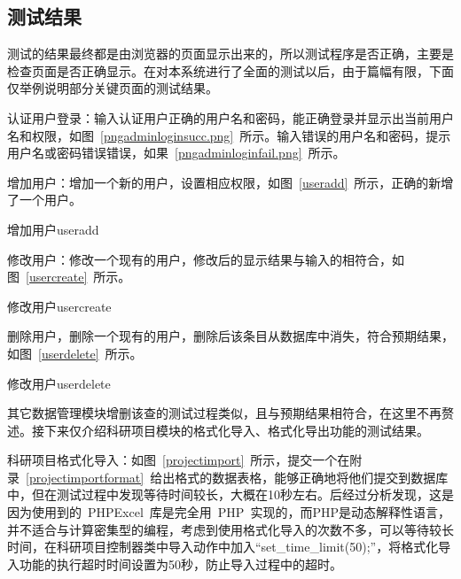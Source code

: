 \subsection{测试结果}

测试的结果最终都是由浏览器的页面显示出来的，所以测试程序是否正确，主要是检查页面是否正确显示。在对本系统进行了全面的测试以后，由于篇幅有限，下面仅举例说明部分关键页面的测试结果。

认证用户登录：输入认证用户正确的用户名和密码，能正确登录并显示出当前用户名和权限，如图~\ref{pngadminloginsucc.png}~所示。输入错误的用户名和密码，提示用户名或密码错误错误，如果~\ref{pngadminloginfail.png}~所示。

增加用户：增加一个新的用户，设置相应权限，如图~\ref{useradd}~所示，正确的新增了一个用户。
\begin{pics}[H]{增加用户}{useradd}
\end{pics}

修改用户：修改一个现有的用户，修改后的显示结果与输入的相符合，如图~\ref{usercreate}~所示。
\begin{pics}[H]{修改用户}{usercreate}
\end{pics}

删除用户，删除一个现有的用户，删除后该条目从数据库中消失，符合预期结果，如图~\ref{userdelete}~所示。
\begin{pics}[H]{修改用户}{userdelete}
\end{pics}

其它数据管理模块增删该查的测试过程类似，且与预期结果相符合，在这里不再赘述。接下来仅介绍科研项目模块的格式化导入、格式化导出功能的测试结果。

科研项目格式化导入：如图~\ref{projectimport}~所示，提交一个在附录~\ref{projectimportformat}~给出格式的数据表格，能够正确地将他们提交到数据库中，但在测试过程中发现等待时间较长，大概在10秒左右。后经过分析发现，这是因为使用到的~PHPExcel~库是完全用~PHP~实现的，而PHP是动态解释性语言，并不适合与计算密集型的编程，考虑到使用格式化导入的次数不多，可以等待较长时间，在科研项目控制器类中导入动作中加入“set\_time\_limit(50);”，将格式化导入功能的执行超时时间设置为50秒，防止导入过程中的超时。


